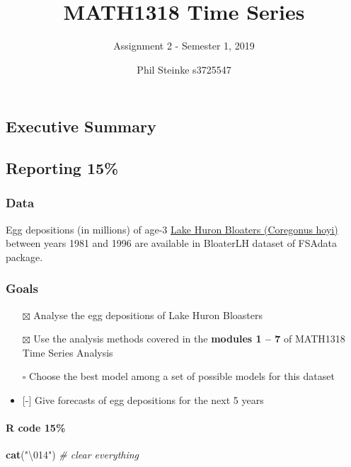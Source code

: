\documentclass[]{article}
\title{MATH1318 Time Series}
\subtitle{Assignment 2 - Semester 1, 2019}
\author{Phil Steinke s3725547}
\date{}
\newenvironment{Shaded}{\begin{snugshade}}{\end{snugshade}}
\newcommand{\CharTok}[1]{\textcolor[rgb]{0.31,0.60,0.02}{#1}}
\newcommand{\CommentTok}[1]{\textcolor[rgb]{0.56,0.35,0.01}{\textit{#1}}}
\newcommand{\KeywordTok}[1]{\textcolor[rgb]{0.13,0.29,0.53}{\textbf{#1}}}
\newcommand{\NormalTok}[1]{#1}
\newcommand{\StringTok}[1]{\textcolor[rgb]{0.31,0.60,0.02}{#1}}
\providecommand{\tightlist}{%
  \setlength{\itemsep}{0pt}\setlength{\parskip}{0pt}}
\let\oldparagraph\paragraph
\renewcommand{\paragraph}[1]{\oldparagraph{#1}\mbox{}}
\begin{document}
\maketitle

\hypertarget{executive-summary}{%
\subsection{Executive Summary}\label{executive-summary}}

\hypertarget{reporting-15}{%
\subsection{Reporting 15\%}\label{reporting-15}}

\hypertarget{data}{%
\subsubsection{Data}\label{data}}

Egg depositions (in millions) of age-3
\href{https://en.wikipedia.org/wiki/Coregonus_hoyi}{Lake Huron Bloaters
(Coregonus hoyi)} between years 1981 and 1996 are available in BloaterLH
dataset of FSAdata package.

\hypertarget{goals}{%
\subsubsection{Goals}\label{goals}}

\begin{itemize}
\tightlist
\item[$\boxtimes$]
  Analyse the egg depositions of Lake Huron Bloasters
\item[$\boxtimes$]
  Use the analysis methods covered in the \textbf{modules 1 -- 7} of
  MATH1318 Time Series Analysis
\item[$\square$]
  Choose the best model among a set of possible models for this dataset
\item
  {[}-{]} Give forecasts of egg depositions for the next 5 years
\end{itemize}

\hypertarget{r-code-15}{%
\paragraph{R code 15\%}\label{r-code-15}}

\begin{Shaded}
\begin{Highlighting}[]
\KeywordTok{cat}\NormalTok{(}\StringTok{"}\CharTok{\textbackslash{}014}\StringTok{"}\NormalTok{) }\CommentTok{# clear everything}
\end{Highlighting}
\end{Shaded}
\end{document}
